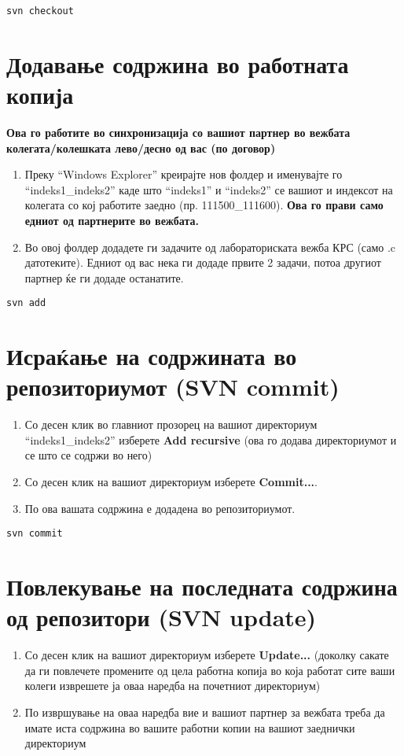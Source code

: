 \documentclass[12pt,a4paper]{exam}
\begin{document}
\texttt{svn checkout}

\section{Додавање содржина во работната копија}
\textbf{Ова го работите во синхронизација со вашиот партнер во вежбата
колегата/колешката лево/десно од вас (по договор)}
\begin{enumerate}
  \item Преку ``Windows Explorer'' креирајте нов фолдер и именувајте го
 ``indeks1\_indeks2'' каде што ``indeks1'' и ``indeks2'' се вашиот и индексот на колегата со кој работите заедно (пр. 111500\_111600).
 \textbf{Ова го прави само едниот од партнерите во вежбата.}
 \item Во овој фолдер додадете ги задачите од лабораториската вежба КРС (само .c
 датотеките). Едниот од вас нека ги додаде првите 2 задачи, потоа другиот партнер ќе ги додаде останатите.
\end{enumerate}
  
\texttt{svn add}
  
\section{Исраќање на содржината во репозиториумот (SVN commit)}

\begin{enumerate}
  \item Со десен клик во главниот прозорец на вашиот директориум ``indeks1\_indeks2''
 изберете \textbf{Add recursive} (ова го додава директориумот и се што се содржи во него)
  \item Со десен клик на вашиот директориум изберете \textbf{Commit...}.
  \item По ова вашата содржина е додадена во репозиториумот.
\end{enumerate}

\texttt{svn commit}

\section{Повлекување на последната содржина од репозитори (SVN update)}

\begin{enumerate}
  \item Со десен клик на вашиот директориум изберете \textbf{Update...} (доколку сакате
  да ги повлечете промените од цела работна копија во која работат сите ваши
  колеги изврешете ја оваа наредба на почетниот директориум)
  \item По извршување на оваа наредба вие и вашиот партнер за вежбата треба да
  имате иста содржина во вашите работни копии на вашиот заеднички директориум
\end{enumerate}
\end{document}

